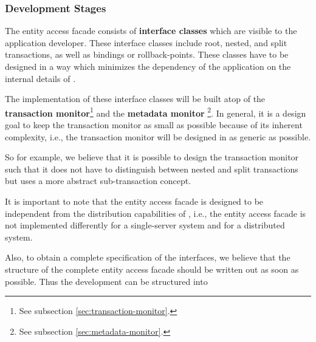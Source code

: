 \documentclass[a4paper, 10pt]{book}
\begin{document}
                                \subsubsection{Development Stages}
                                \label{sec:development-stages}


                                The entity access facade consists of \textbf{interface classes}
                                which are visible to the application developer. These interface
                                classes include root, nested, and split transactions, as well as
                                bindings or rollback-points. These classes have to be designed in a
                                way which minimizes the dependency of the application on the internal
                                details of \SYNEIGHT.

                                The implementation of these interface classes will be built atop of
                                the \textbf{transaction monitor}\footnote{See subsection
                                \vref{sec:transaction-monitor}.} and the \textbf{metadata monitor}
                                \footnote{See subsection \vref{sec:metadata-monitor}.}.
                                In general, it is a design goal to keep the transaction monitor as
                                small as possible because of its inherent complexity, i.e., the
                                transaction monitor will be designed in as generic as possible.

                                So for example, we believe that it is possible to design the
                                transaction monitor such that it does not have to distinguish between
                                nested and split transactions but uses a more abstract sub-transaction
                                concept.

                                It is important to note that the entity access facade is designed to
                                be independent from the distribution capabilities of \SYNEIGHT, i.e., the
                                entity access facade is not implemented differently for a
                                single-server system and for a distributed system.

                                Also, to obtain a complete specification of the \SYNEIGHT interfaces, we
                                believe that the structure of the complete entity access facade should
                                be written out as soon as possible. Thus the development can be
                                structured into 
\end{document}
